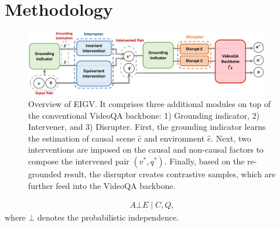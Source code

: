 \section{Methodology}
\label{sec:method}

\begin{figure}[t]
\centering
\includegraphics[width=0.95\textwidth]{fig/main.pdf}
\vspace{-14pt}
\caption{Overview of EIGV. It comprises three additional modules on top of the conventional VideoQA backbone: 1) Grounding indicator, 2) Intervener, and 3) Disrupter. First, the grounding indicator learns the estimation of causal scene $\hat{c}$ and environment $\hat{e}$. Next, two interventions are imposed on the causal and non-causal factors to compose the intervened pair $(v^*,q^*)$. Finally, based on the re-grounded result, the disruptor creates contrastive samples, which are further feed into the VideoQA backbone.}
\vspace{-5pt}
\label{fig:main}
\end{figure}

\begin{gather}\label{equ:eq0}
      A\bot E \mid C,Q,
\end{gather}
where $\bot$ denotes the probabilistic independence. 
%

